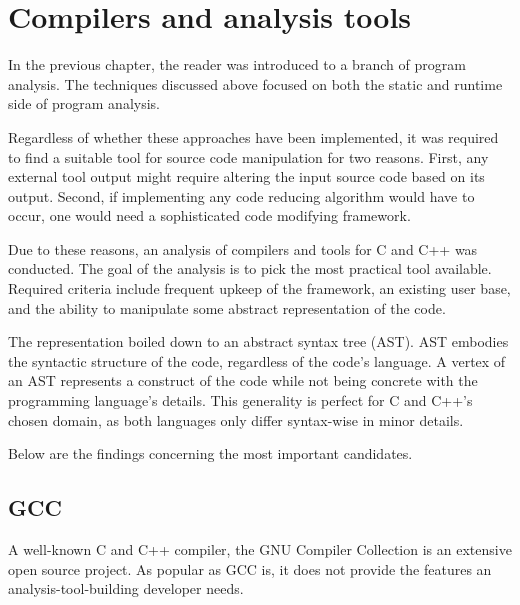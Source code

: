 \chapter{Compilers and analysis tools}



In the previous chapter, the reader was introduced to a branch of program
ana\-ly\-sis. 
The techniques discussed above focused on both the static and runtime
side of program analysis. 

Regardless of whether these approaches have been implemented, it was 
required to find a suitable tool for source code manipulation for two reasons. 
First, any external tool output might require altering the input source code 
based on its output. 
Second, if implementing any code reducing algorithm would have to occur, 
one would need a sophisticated code modifying framework. 

Due to these reasons, an analysis of compilers and tools for C and C++ was conducted. 
The goal of the analysis is to pick the most practical tool available. 
Required criteria include frequent upkeep of the framework, 
an existing user base, and the ability to manipulate some abstract 
representation of the code.

The representation boiled down to an abstract syntax tree (AST). 
AST embodies the syntactic structure of the code, regardless of the code's language. 
A vertex of an AST represents a construct of the code while not being concrete 
with the programming language's details. 
This generality is perfect for C and C++'s chosen domain, 
as both languages only differ syntax-wise in minor details.


Below are the findings concerning the most important candidates.

\section{GCC}

A well-known C and C++ compiler, the GNU Compiler Collection is an extensive
open source project. 
As popular as GCC is, it does not provide the features an analysis-tool-building 
developer needs. 

